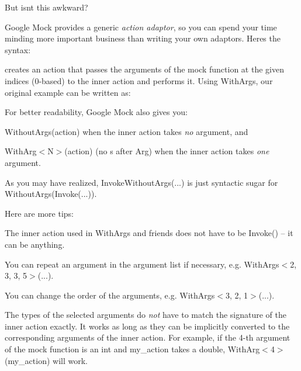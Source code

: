 But isn\textquotesingle{}t this awkward?

Google Mock provides a generic {\itshape action adaptor}, so you can spend your time minding more important business than writing your own adaptors. Here\textquotesingle{}s the syntax\+:


\begin{DoxyCode}{0}
\end{DoxyCode}


creates an action that passes the arguments of the mock function at the given indices (0-\/based) to the inner {\ttfamily action} and performs it. Using {\ttfamily With\+Args}, our original example can be written as\+:


\begin{DoxyCode}{0}
\end{DoxyCode}


For better readability, Google Mock also gives you\+:


\begin{DoxyItemize}
\item {\ttfamily Without\+Args(action)} when the inner {\ttfamily action} takes {\itshape no} argument, and
\item {\ttfamily With\+Arg$<$N$>$(action)} (no {\ttfamily s} after {\ttfamily Arg}) when the inner {\ttfamily action} takes {\itshape one} argument.
\end{DoxyItemize}

As you may have realized, {\ttfamily Invoke\+Without\+Args(...)} is just syntactic sugar for {\ttfamily Without\+Args(\+Invoke(...))}.

Here are more tips\+:


\begin{DoxyItemize}
\item The inner action used in {\ttfamily With\+Args} and friends does not have to be {\ttfamily Invoke()} -- it can be anything.
\item You can repeat an argument in the argument list if necessary, e.\+g. {\ttfamily With\+Args$<$2, 3, 3, 5$>$(...)}.
\item You can change the order of the arguments, e.\+g. {\ttfamily With\+Args$<$3, 2, 1$>$(...)}.
\item The types of the selected arguments do {\itshape not} have to match the signature of the inner action exactly. It works as long as they can be implicitly converted to the corresponding arguments of the inner action. For example, if the 4-\/th argument of the mock function is an {\ttfamily int} and {\ttfamily my\+\_\+action} takes a {\ttfamily double}, {\ttfamily With\+Arg$<$4$>$(my\+\_\+action)} will work.
\end{DoxyItemize}

